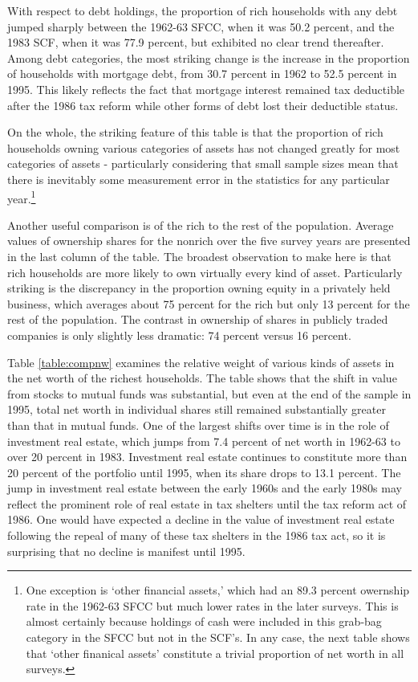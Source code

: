 \documentclass[12pt]{article}
\begin{document}
With respect to debt holdings, the proportion of rich households with any
debt jumped sharply between the 1962-63 SFCC, when it was 50.2 percent, and
the 1983 SCF, when it was 77.9 percent, but exhibited no clear trend
thereafter. Among debt categories, the most striking change is the increase
in the proportion of households with mortgage debt, from 30.7 percent in
1962 to 52.5 percent in 1995. This likely reflects the fact that mortgage
interest remained tax deductible after the 1986 tax reform while other forms
of debt lost their deductible status.

On the whole, the striking feature of this table is that the proportion of
rich households owning various categories of assets has not changed greatly
for most categories of assets - particularly considering that small sample
sizes mean that there is inevitably some measurement error in the statistics
for any particular year.\footnote{%
One exception is `other financial assets,' which had an 89.3 percent
owernship rate in the 1962-63 SFCC but much lower rates in the later
surveys. This is almost certainly because holdings of cash were included in
this grab-bag category in the SFCC but not in the SCF's. In any case, the
next table shows that `other finanical assets' constitute a trivial
proportion of net worth in all surveys.}

Another useful comparison is of the rich to the rest of the population.
Average values of ownership shares for the nonrich over the five survey
years are presented in the last column of the table. The broadest
observation to make here is that rich households are more likely to own
virtually every kind of asset. Particularly striking is the discrepancy in
the proportion owning equity in a privately held business, which averages
about 75 percent for the rich but only 13 percent for the rest of the
population. The contrast in ownership of shares in publicly traded companies
is only slightly less dramatic: 74 percent versus 16 percent.

Table \ref{table:compnw} examines the relative weight of various kinds of
assets in the net worth of the richest households. The table shows that the
shift in value from stocks to mutual funds was substantial, but even at the
end of the sample in 1995, total net worth in individual shares still
remained substantially greater than that in mutual funds. One of the largest
shifts over time is in the role of investment real estate, which jumps from
7.4 percent of net worth in 1962-63 to over 20 percent in 1983. Investment
real estate continues to constitute more than 20 percent of the portfolio
until 1995, when its share drops to 13.1 percent. The jump in investment
real estate between the early 1960s and the early 1980s may reflect the
prominent role of real estate in tax shelters until the tax reform act of
1986. One would have expected a decline in the value of investment real
estate following the repeal of many of these tax shelters in the 1986 tax
act, so it is surprising that no decline is manifest until 1995.
\end{document}
